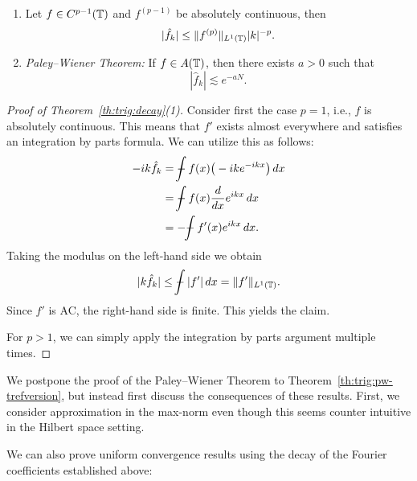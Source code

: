 \begin{theorem} \label{th:trig:decay}
  \begin{enumerate} \ilist
    \item Let $f \in C^{p-1}(\mathbb{T})$ and $f^{(p-1)}$ be absolutely continuous, then 
    \[
        |\hat{f}_k| \leq \| f^{(p)} \|_{L^1(\mathbb{T})} |k|^{-p}.
    \]
    \item {\it Paley--Wiener Theorem:} If $f \in A(\mathbb{T})$, then there exists
    $a > 0$ such that
    \[
        |\hat{f}_k| \lesssim e^{-a N}.
    \]
  \end{enumerate}
\end{theorem}
\begin{proof}[Proof of Theorem~\ref{th:trig:decay}(1)]
  Consider first the case $p = 1$, i.e., $f$ is absolutely continuous. This means that $f'$ exists almost everywhere and satisfies an integration by parts formula. We can utilize this as follows: 
  \begin{align*}
    -i k \hat{f}_k &= \mint f(x) \big(- i k e^{-ikx}\big) \, dx \\
    &= \mint f(x) \frac{d}{dx} e^{ikx}\, dx \\
    &= - \mint f'(x) e^{ikx}\, dx.
  \end{align*}
  Taking the modulus on the left-hand side we obtain 
  \[
    |k \hat{f}_k| \leq \mint |f'| \,dx = \|f'\|_{L^1(\TT)}.
  \]
  Since $f'$ is AC, the right-hand side is finite. This yields the claim.

  For $p > 1$, we can simply apply the integration by parts argument multiple times. 
\end{proof}

We postpone the proof of the Paley--Wiener Theorem to
Theorem~\ref{th:trig:pw-trefversion}, but instead first discuss the consequences
of these results. First, we consider approximation in the max-norm even though this seems counter intuitive in the Hilbert space setting.

We can also prove uniform convergence results using the decay of the Fourier coefficients established above:

